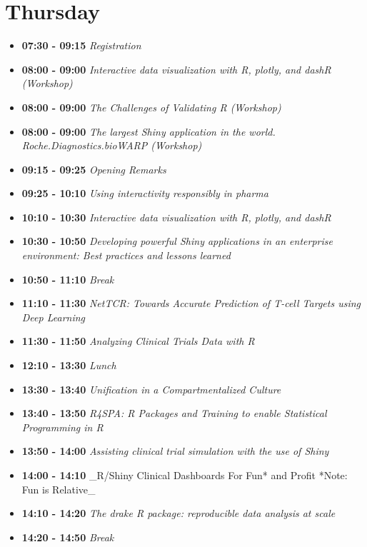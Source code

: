 \documentclass[]{book}
\providecommand{\tightlist}{%
  \setlength{\itemsep}{0pt}\setlength{\parskip}{0pt}}
\theoremstyle{definition}
\theoremstyle{definition}
\theoremstyle{definition}
\theoremstyle{remark}
\begin{document}
\hypertarget{thursday}{%
\section{Thursday}\label{thursday}}

\begin{itemize}
\tightlist
\item
  \textbf{07:30 - 09:15} \emph{Registration}
\item
  \textbf{08:00 - 09:00} \emph{Interactive data visualization with R,
  plotly, and dashR (Workshop)}
\item
  \textbf{08:00 - 09:00} \emph{The Challenges of Validating R
  (Workshop)}
\item
  \textbf{08:00 - 09:00} \emph{The largest Shiny application in the
  world. Roche.Diagnostics.bioWARP (Workshop)}
\item
  \textbf{09:15 - 09:25} \emph{Opening Remarks}
\item
  \textbf{09:25 - 10:10} \emph{Using interactivity responsibly in
  pharma}
\item
  \textbf{10:10 - 10:30} \emph{Interactive data visualization with R,
  plotly, and dashR}
\item
  \textbf{10:30 - 10:50} \emph{Developing powerful Shiny applications in
  an enterprise environment: Best practices and lessons learned}
\item
  \textbf{10:50 - 11:10} \emph{Break}
\item
  \textbf{11:10 - 11:30} \emph{NetTCR: Towards Accurate Prediction of
  T-cell Targets using Deep Learning}
\item
  \textbf{11:30 - 11:50} \emph{Analyzing Clinical Trials Data with R}
\item
  \textbf{12:10 - 13:30} \emph{Lunch}
\item
  \textbf{13:30 - 13:40} \emph{Unification in a Compartmentalized
  Culture}
\item
  \textbf{13:40 - 13:50} \emph{R4SPA: R Packages and Training to enable
  Statistical Programming in R}
\item
  \textbf{13:50 - 14:00} \emph{Assisting clinical trial simulation with
  the use of Shiny}
\item
  \textbf{14:00 - 14:10} \_R/Shiny Clinical Dashboards For Fun* and
  Profit *Note: Fun is Relative\_
\item
  \textbf{14:10 - 14:20} \emph{The drake R package: reproducible data
  analysis at scale}
\item
  \textbf{14:20 - 14:50} \emph{Break}

\end{itemize}
\end{document}
